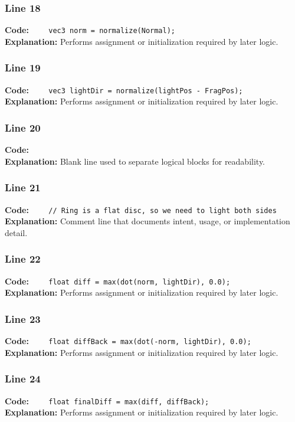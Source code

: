 \documentclass[11pt,a4paper]{article}
\begin{document}
\subsubsection*{Line 18}
\textbf{Code:} \verb|    vec3 norm = normalize(Normal);|\\
\textbf{Explanation:} Performs assignment or initialization required by later logic.

\subsubsection*{Line 19}
\textbf{Code:} \verb|    vec3 lightDir = normalize(lightPos - FragPos);|\\
\textbf{Explanation:} Performs assignment or initialization required by later logic.

\subsubsection*{Line 20}
\textbf{Code:} \verb|    |\\
\textbf{Explanation:} Blank line used to separate logical blocks for readability.

\subsubsection*{Line 21}
\textbf{Code:} \verb|    // Ring is a flat disc, so we need to light both sides|\\
\textbf{Explanation:} Comment line that documents intent, usage, or implementation detail.

\subsubsection*{Line 22}
\textbf{Code:} \verb|    float diff = max(dot(norm, lightDir), 0.0);|\\
\textbf{Explanation:} Performs assignment or initialization required by later logic.

\subsubsection*{Line 23}
\textbf{Code:} \verb|    float diffBack = max(dot(-norm, lightDir), 0.0);|\\
\textbf{Explanation:} Performs assignment or initialization required by later logic.

\subsubsection*{Line 24}
\textbf{Code:} \verb|    float finalDiff = max(diff, diffBack);|\\
\textbf{Explanation:} Performs assignment or initialization required by later logic.
\end{document}
